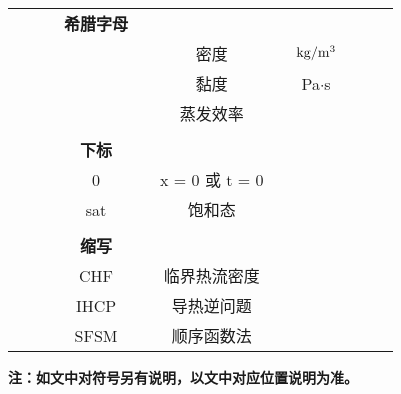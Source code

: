 \begin{denotation}
\begin{center}
\begin{table}[htbp]
\begin{tabular}{rrrcccccccccccccrrr}
		&       &       & \multicolumn{3}{c}{\textbf{希腊字母}} &       & \multicolumn{4}{c}{}          &       & \multicolumn{4}{c}{}          &       &       &  \\
		&       &       & \multicolumn{3}{c}{}  &       & \multicolumn{4}{c}{密度}        &       & \multicolumn{4}{c}{$\rm{kg/{m}^{3}}$}     &       &       &  \\
		&       &       & \multicolumn{3}{c}{}  &       & \multicolumn{4}{c}{黏度}        &       & \multicolumn{4}{c}{Pa$\cdot$s}      &       &       &  \\
		&       &       & \multicolumn{3}{c}{}  &       & \multicolumn{4}{c}{蒸发效率}      &       & \multicolumn{4}{c}{}          &       &       &  \\
		&       &       & \multicolumn{3}{c}{}  &       & \multicolumn{4}{c}{}          &       & \multicolumn{4}{c}{}          &       &       &  \\
		&       &       & \multicolumn{3}{c}{\textbf{下标}} &       & \multicolumn{4}{c}{}          &       & \multicolumn{4}{c}{}          &       &       &  \\
		&       &       & \multicolumn{3}{c}{0} &       & \multicolumn{4}{c}{x = 0 或 t = 0} &       & \multicolumn{4}{c}{}          &       &       &  \\
		&       &       & \multicolumn{3}{c}{sat} &       & \multicolumn{4}{c}{饱和态}       &       & \multicolumn{4}{c}{}          &       &       &  \\
		&       &       & \multicolumn{3}{c}{}  &       & \multicolumn{4}{c}{}          &       & \multicolumn{4}{c}{}          &       &       &  \\
		&       &       & \multicolumn{3}{c}{\textbf{缩写}} &       & \multicolumn{4}{c}{}          &       & \multicolumn{4}{c}{}          &       &       &  \\
		&       &       & \multicolumn{3}{c}{CHF} &       & \multicolumn{4}{c}{临界热流密度}    &       & \multicolumn{4}{c}{}          &       &       &  \\
		&       &       & \multicolumn{3}{c}{IHCP} &       & \multicolumn{4}{c}{导热逆问题}     &       & \multicolumn{4}{c}{}          &       &       &  \\
		&       &       & \multicolumn{3}{c}{SFSM} &       & \multicolumn{4}{c}{顺序函数法}     &       & \multicolumn{4}{c}{}          &       &       &  \\
		\bottomrule
	\end{tabular}%
	\label{tab:addlabel}%
\end{table}%
\vspace{-10pt}
\hspace{-68pt}
\textbf{注：如文中对符号另有说明，以文中对应位置说明为准。}



\end{center}
\end{denotation}